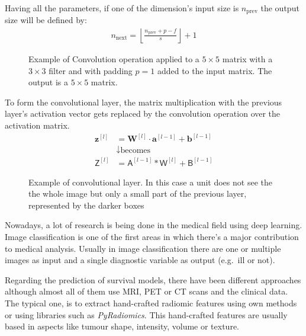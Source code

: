 Having all the parameters, if one of the dimension's input size is \( n_{\text{prev}} \)
the output size will be defined by:
\begin{align*}
  n_{\text{next}} = \left\lfloor\frac{n_{\text{prev}} + p - f}{s}\right\rfloor + 1
\end{align*}

\begin{figure}
  \centering
  
  \caption[Convolution operation example]{
    Example of Convolution operation applied to a \( 5 \times 5 \) matrix with a 
    \( 3 \times 3 \) filter and with padding \( p = 1 \) added to the input matrix. 
    The output is a \( 5 \times 5 \) matrix.
    \label{fig:conv-operation}
  }
\end{figure}

To form the convolutional layer, the matrix multiplication with the previous layer's 
activation vector gets replaced by the convolution operation over the activation 
matrix. 
\begin{align*}
  \bm{z}^{[l]} &= \bm{W}^{[l]} \cdot \bm{a}^{[l - 1]} + \bm{b}^{[l - 1]} \\
  &\downarrow \text{becomes} \\
  \bm{\mathsf{Z}}^{[l]} &= \bm{\mathsf{A}}^{[l - 1]} * \bm{\mathsf{W}}^{[l]} + 
  \bm{\mathsf{B}}^{[l - 1]}
\end{align*}

\begin{figure}
  \centering
  
  \caption[Convolutional layer]{Example of convolutional layer. In this case a unit does not 
  see the the whole image but only a small part of the previous layer, represented by 
  the darker boxes}
\end{figure}


Nowadays, a lot of research is being done in the medical field using deep learning. Image
classification is one of the first areas in which there's a major contribution to medical analysis.
Usually in image classification there are one or multiple images as input and a single diagnostic 
variable as output (e.g.~ill or not).
~\cite{medical:survey-deep-learning}

Regarding the prediction of survival models, there have been different approaches although
almost all of them use \gls{MRI}, \gls{PET} or \gls{CT} scans and the clinical data. 
The typical one, is to extract hand-crafted radiomic features using own methods or using 
libraries such as \emph{PyRadiomics}. This 
hand-crafted features are usually based in aspects like tumour shape, intensity, volume or texture.
~\cite{medical:tumour-radiomics, medical:py-radiomics, medical:computational-radiomics}

